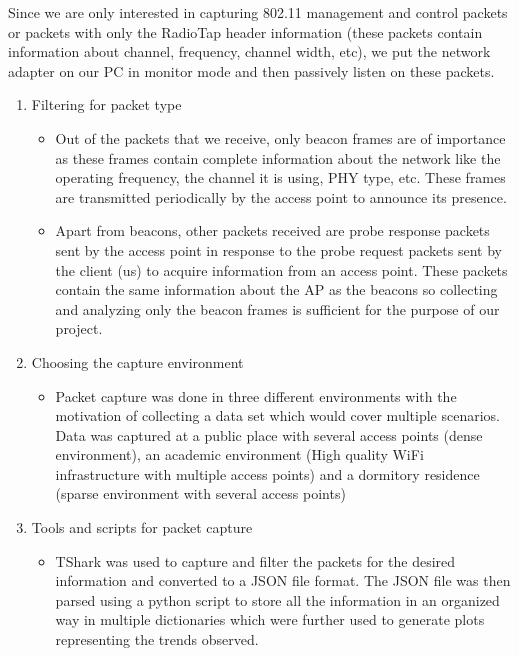 \documentclass{article}
\begin{document}
Since we are only interested in capturing 802.11 management and control packets or packets with only the RadioTap header information (these packets contain information about channel, frequency, channel width, etc), we put the network adapter on our PC in monitor mode and then passively listen on these packets. 
\begin{enumerate}
    \item Filtering for packet type
    \begin{itemize}
        \item Out of the packets that we receive, only beacon frames are of importance as these frames contain complete information about the network like the operating frequency, the channel it is using, PHY type, etc. These frames are transmitted periodically by the access point to announce its presence.
        \item Apart from beacons, other packets received are probe response packets sent by the access point in response to the probe request packets sent by the client (us) to acquire information from an access point. These packets contain the same information about the AP as the beacons so collecting and analyzing only the beacon frames is sufficient for the purpose of our project.
    \end{itemize}
    \item Choosing the capture environment
    \begin{itemize}
        \item Packet capture was done in three different environments with the motivation of collecting a data set which would cover multiple scenarios. Data was captured at a public place with several access points (dense environment), an academic environment (High quality WiFi infrastructure with multiple access points) and a dormitory residence (sparse environment with several access points)
    \end{itemize}
    \item Tools and scripts for packet capture
    \begin{itemize}
        \item TShark was used to capture and filter the packets for the desired information and converted to a JSON file format. The JSON file was then parsed using a python script to store all the information in an organized way in multiple dictionaries which were further used to generate plots representing the trends observed.
    \end{itemize}
    
\end{enumerate}
\end{document}
